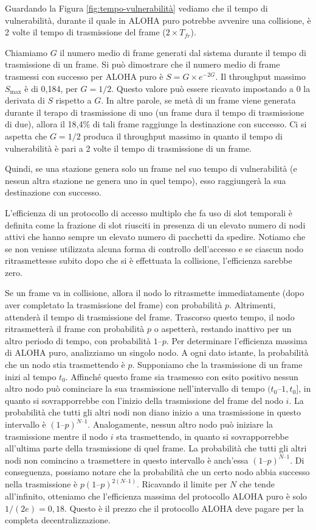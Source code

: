 Guardando la Figura \ref{fig:tempo-vulnerabilità} vediamo che il tempo di vulnerabilità, durante il quale in ALOHA puro potrebbe avvenire una collisione, è 2 volte il tempo di trasmissione del frame ($2\times T_{fr}$).

Chiamiamo $G$ il numero medio di frame generati dal sistema durante il tempo di trasmissione di un frame. Si può dimostrare che il numero medio di frame trasmessi con successo per ALOHA puro è $S = G\times e^{- 2G}$. Il throughput massimo $S_{\max}$ è di 0,184, per $G = 1/2$. Questo valore può essere ricavato impostando a 0 la derivata di $S$ rispetto a $G$. In altre parole, se metà di un frame viene generata durante il terapo di trasmissione di uno (un frame dura il tempo di trasmissione di due), allora il 18,4\% di tali frame raggiunge la destinazione con successo. Ci si aspetta che $G = 1/2$ produca il throughput massimo in quanto il tempo di vulnerabilità è pari a 2 volte il tempo di trasmissione di un frame.

Quindi, se una stazione genera solo un frame nel suo tempo di vulnerabilità (e nessun altra stazione ne genera uno in quel tempo), esso raggiungerà la sua destinazione con successo.

L’efficienza di un protocollo di accesso multiplo che fa uso di slot temporali è definita come la frazione di slot riusciti in presenza di un elevato numero di nodi attivi che hanno sempre un elevato numero di pacchetti da spedire. Notiamo che se non venisse utilizzata alcuna forma di controllo dell’accesso e se ciascun nodo ritrasmettesse subito dopo che si è effettuata la
collisione, l’efficienza sarebbe zero. 

Se un frame va in collisione, allora il nodo lo ritrasmette immediatamente (dopo aver completato la trasmissione del frame) con probabilità $p$. Altrimenti, attenderà il tempo di trasmissione del frame. Trascorso questo tempo, il nodo ritrasmetterà il frame con probabilità $p$ o aspetterà, restando inattivo per un altro periodo di tempo, con probabilità $1 – p$. Per determinare l’efficienza massima di ALOHA puro, analizziamo un singolo nodo. A ogni dato istante, la probabilità che un nodo stia trasmettendo è $p$. Supponiamo che la trasmissione di un frame inizi al tempo $t_0$. Affinché questo frame sia trasmesso con esito positivo nessun altro nodo può cominciare la sua trasmissione nell’intervallo di tempo $(t_0 – 1, t_0]$, in quanto si sovrapporrebbe con l’inizio della trasmissione del frame del nodo $i$. La probabilità che tutti gli altri nodi non diano inizio a una trasmissione in questo intervallo è $(1 – p)^{N –1}$. Analogamente, nessun altro nodo può iniziare la trasmissione mentre il nodo $i$ sta trasmettendo, in quanto si sovrapporrebbe all’ultima parte della trasmissione di quel frame. La probabilità che tutti gli altri nodi non comincino a trasmettere in questo intervallo è anch’essa $(1 – p)^{N –1}$. Di conseguenza, possiamo notare che la probabilità che un certo nodo abbia successo nella trasmissione è $p(1 – p)^{2(N –1)}$. Ricavando il limite per $N$ che tende all’infinito, otteniamo che l’efficienza massima del protocollo ALOHA puro è solo $1/(2e)=0,18$. Questo è il prezzo che il protocollo ALOHA deve pagare per la completa decentralizzazione.

